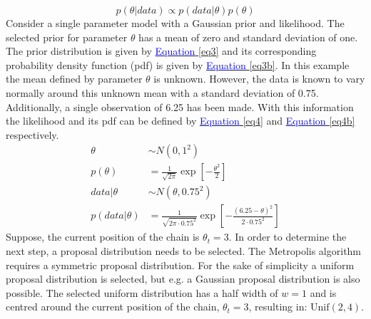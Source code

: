 \begin{equation}
p(\theta|data) \propto p(data|\theta)p(\theta)\label{eq2}
\end{equation}
\newline %
\indent Consider a single parameter model with a Gaussian prior and likelihood. The selected prior for parameter $\theta$ has a mean of zero and standard deviation of one. The prior distribution is given by \hyperref[eq3]{\textcolor{blue}{Equation} \ref{eq3}} and its corresponding probability density function (pdf) is given by \hyperref[eq3b]{\textcolor{blue}{Equation} \ref{eq3b}}. In this example the mean defined by parameter $\theta$ is unknown. However, the data is known to vary normally around this unknown mean with a standard deviation of 0.75. Additionally, a single observation of 6.25 has been made. With this information the likelihood and its pdf can be defined by \hyperref[eq4]{\textcolor{blue}{Equation} \ref{eq4}} and \hyperref[eq4b]{\textcolor{blue}{Equation} \ref{eq4b}} respectively.
\begin{align}
    \theta      &\sim N(0, 1^2)             \label{eq3} \\
    p(\theta)      &= \frac{1}{\sqrt{2 \pi}} \exp{ \left[ - \frac{\theta^2}{2} \right]} \label{eq3b} \\
    data|\theta &\sim N(\theta, 0.75^2)  \label{eq4} \\
    p(data|\theta) &= \frac{1}{\sqrt{2 \pi \cdot 0.75^2}} \exp{ \left[ - \frac{(6.25 - \theta)^2}{2 \cdot 0.75^2} \right]} \label{eq4b}
\end{align}
\indent Suppose, the current position of the chain is $\theta_{t} = 3$. In order to determine the next step, a proposal distribution needs to be selected. The Metropolis algorithm requires a symmetric proposal distribution. For the sake of simplicity a uniform proposal distribution is selected, but e.g. a Gaussian proposal distribution is also possible. The selected uniform distribution has a half width of $w = 1$ and is centred around the current position of the chain, $\theta_{t} = 3$, resulting in: $\text{Unif}(2,4)$. 

